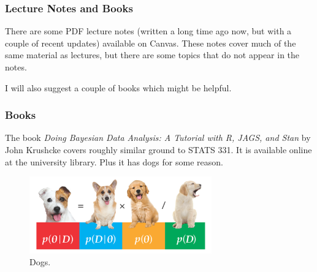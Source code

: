 \documentclass{beamer}
\begin{document}
\begin{frame}
\frametitle{Lecture Notes and Books}
There are some PDF lecture notes (written a long time ago now, but with a
couple of recent updates) available on Canvas. These notes cover much of
the same material as lectures, but there are some topics that do not appear in
the notes.\\[1em] \pause

I will also suggest a couple of books which might be helpful.
\end{frame}


\begin{frame}
\frametitle{Books}
The book {\em Doing Bayesian Data Analysis: A Tutorial with R, JAGS, and Stan}
by John Krushcke covers roughly similar ground to STATS 331.
It is available online at the university library.
Plus it has dogs for some reason.

\begin{figure}[!h]
\includegraphics[width=0.7\textwidth]{images/dogs.png}
\caption{Dogs.\label{fig:dogs}}
\end{figure}

\end{frame}
\end{document}
